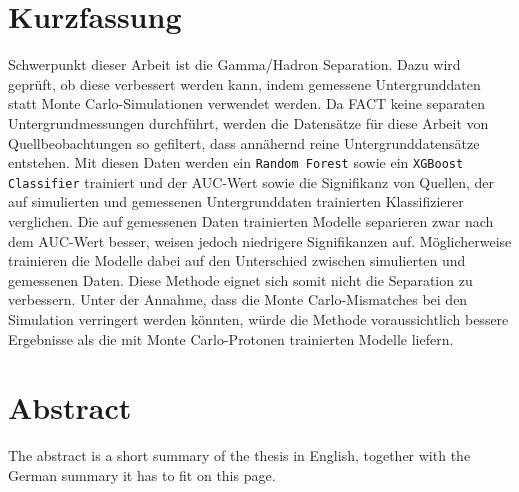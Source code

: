 \thispagestyle{plain}

\section*{Kurzfassung}
Schwerpunkt dieser Arbeit ist die Gamma/Hadron Separation. 
Dazu wird geprüft, ob diese verbessert werden kann, indem gemessene Untergrunddaten statt Monte Carlo-Simulationen verwendet werden.
Da FACT keine separaten Untergrundmessungen durchführt, werden die Datensätze für diese Arbeit von Quellbeobachtungen so gefiltert, dass annähernd reine Untergrunddatensätze entstehen.
Mit diesen Daten werden ein \texttt{Random Forest} sowie ein \texttt{XGBoost Classifier} trainiert und der AUC-Wert sowie die Signifikanz von Quellen, der auf simulierten und gemessenen Untergrunddaten trainierten Klassifizierer verglichen. 
Die auf gemessenen Daten trainierten Modelle separieren zwar nach dem AUC-Wert besser, weisen jedoch niedrigere Signifikanzen auf. 
Möglicherweise trainieren die Modelle dabei auf den Unterschied zwischen simulierten und gemessenen Daten. 
Diese Methode eignet sich somit nicht die Separation zu verbessern. 
Unter der Annahme, dass die Monte Carlo-Mismatches bei den Simulation verringert werden könnten, würde die Methode voraussichtlich bessere Ergebnisse als die mit Monte Carlo-Protonen trainierten Modelle liefern.

\section*{Abstract}
\begin{english}
The abstract is a short summary of the thesis in English, together with the German summary it has to fit on this page.
\end{english}
